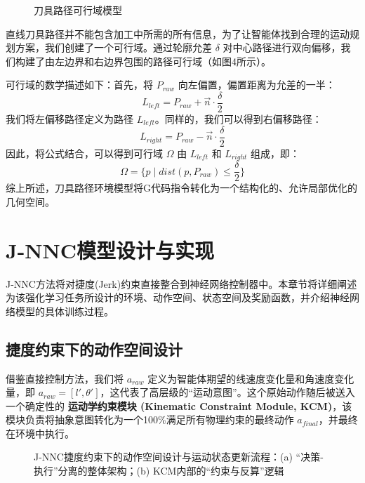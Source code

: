 \documentclass[preprint,12pt]{elsarticle}
\begin{document}
\begin{figure}[htbp]
    \centering
    \caption{刀具路径可行域模型}
    \label{fig:feasible_region}
\end{figure}

直线刀具路径并不能包含加工中所需的所有信息，为了让智能体找到合理的运动规划方案，我们创建了一个可行域。通过轮廓允差 $\delta$ 对中心路径进行双向偏移，我们构建了由左边界和右边界包围的路径可行域（如图4所示）。

可行域的数学描述如下：首先，将 $P_{raw}$ 向左偏置，偏置距离为允差的一半：
\begin{equation}
    L_{left} = P_{raw} + \vec{n} \cdot \frac{\delta}{2}
\end{equation}
我们将左偏移路径定义为路径 $L_{left}$。同样的，我们可以得到右偏移路径：
\begin{equation}
    L_{right} = P_{raw} - \vec{n} \cdot \frac{\delta}{2}
\end{equation}
因此，将公式结合，可以得到可行域 $\Omega$ 由 $L_{left}$ 和 $L_{right}$ 组成，即：
\begin{equation}
    \Omega = \{p \mid dist(p, P_{raw}) \leq \frac{\delta}{2}\}
\end{equation}
综上所述，刀具路径环境模型将G代码指令转化为一个结构化的、允许局部优化的几何空间。

\section{J-NNC模型设计与实现}
\label{sec:model}

J-NNC方法将对捷度(Jerk)约束直接整合到神经网络控制器中。本章节将详细阐述为该强化学习任务所设计的环境、动作空间、状态空间及奖励函数，并介绍神经网络模型的具体训练过程。

\subsection{捷度约束下的动作空间设计}
借鉴直接控制方法\cite{Li2020}，我们将 $a_{raw}$ 定义为智能体期望的线速度变化量和角速度变化量，即 $a_{raw} = [l', \theta']$，这代表了高层级的“运动意图”。这个原始动作随后被送入一个确定性的 \textbf{运动学约束模块 (Kinematic Constraint Module, KCM)}，该模块负责将抽象意图转化为一个100\%满足所有物理约束的最终动作 $a_{final}$，并最终在环境中执行。

\begin{figure}[htbp]
    \centering
    \caption{J-NNC捷度约束下的动作空间设计与运动状态更新流程：(a) “决策-执行”分离的整体架构；(b) KCM内部的“约束与反算”逻辑}
    \label{fig:kcm_flow}
\end{figure}
\end{document}

